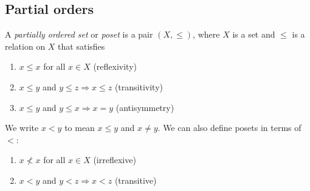 \documentclass[a4paper]{article}
\begin{document}
\subsection{Partial orders}
\begin{defi}
  A \emph{partially ordered set} or \emph{poset} is a pair $(X, \leq)$, where $X$ is a set and $\leq$ is a relation on $X$ that satisfies
  \begin{enumerate}
    \item $x\leq x$ for all $x\in X$ \hfill (reflexivity)
    \item $x \leq y$ and $y \leq z \Rightarrow x \leq z$ \hfill (transitivity)
    \item $x \leq y$ and $y \leq x \Rightarrow x = y$ \hfill (antisymmetry)
  \end{enumerate}
  We write $x < y$ to mean $ x\leq y$ and $x\not= y$. We can also define posets in terms of~$<$:
  \begin{enumerate}
    \item $x \not< x$ for all $x\in X$ \hfill (irreflexive)
    \item $x < y$ and $y < z\Rightarrow x < z$ \hfill (transitive)
  \end{enumerate}
\end{defi}
\end{document}
